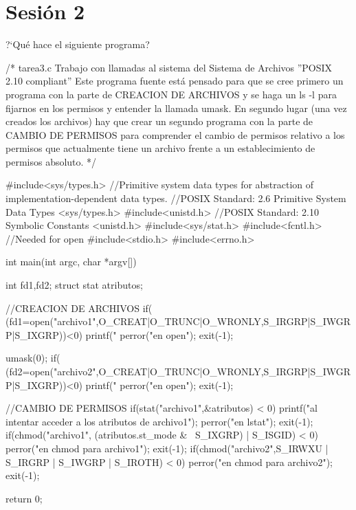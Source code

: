 \chapter{Sesión 2}

\begin{exercise}
?`Qué hace el siguiente programa?

\end{exercise}
\begin{cppcode}
/*
tarea3.c
Trabajo con llamadas al sistema del Sistema de Archivos ''POSIX 2.10 compliant''
Este programa fuente está pensado para que se cree primero un programa con la parte
 de CREACION DE ARCHIVOS y se haga un ls -l para fijarnos en los permisos y entender
 la llamada umask.
En segundo lugar (una vez creados los archivos) hay que crear un segundo programa
 con la parte de CAMBIO DE PERMISOS para comprender el cambio de permisos relativo
 a los permisos que actualmente tiene un archivo frente a un establecimiento de permisos
 absoluto.
*/

#include<sys/types.h>   //Primitive system data types for abstraction of implementation-dependent data types.
                        //POSIX Standard: 2.6 Primitive System Data Types <sys/types.h>
#include<unistd.h>      //POSIX Standard: 2.10 Symbolic Constants         <unistd.h>
#include<sys/stat.h>
#include<fcntl.h>       //Needed for open
#include<stdio.h>
#include<errno.h>


int main(int argc, char *argv[])
{
int fd1,fd2;
struct stat atributos;

//CREACION DE ARCHIVOS
if( (fd1=open("archivo1",O_CREAT|O_TRUNC|O_WRONLY,S_IRGRP|S_IWGRP|S_IXGRP))<0) {
    printf("\nError %
    perror("\nError en open");
    exit(-1);
}

umask(0);
if( (fd2=open("archivo2",O_CREAT|O_TRUNC|O_WRONLY,S_IRGRP|S_IWGRP|S_IXGRP))<0) {
    printf("\nError %
    perror("\nError en open");
    exit(-1);
}

//CAMBIO DE PERMISOS
if(stat("archivo1",&atributos) < 0) {
    printf("\nError al intentar acceder a los atributos de archivo1");
    perror("\nError en lstat");
    exit(-1);
}
if(chmod("archivo1", (atributos.st_mode & ~S_IXGRP) | S_ISGID) < 0) {
    perror("\nError en chmod para archivo1");
    exit(-1);
}
if(chmod("archivo2",S_IRWXU | S_IRGRP | S_IWGRP | S_IROTH) < 0) {
    perror("\nError en chmod para archivo2");
    exit(-1);
}

return 0;
}
\end{cppcode}

